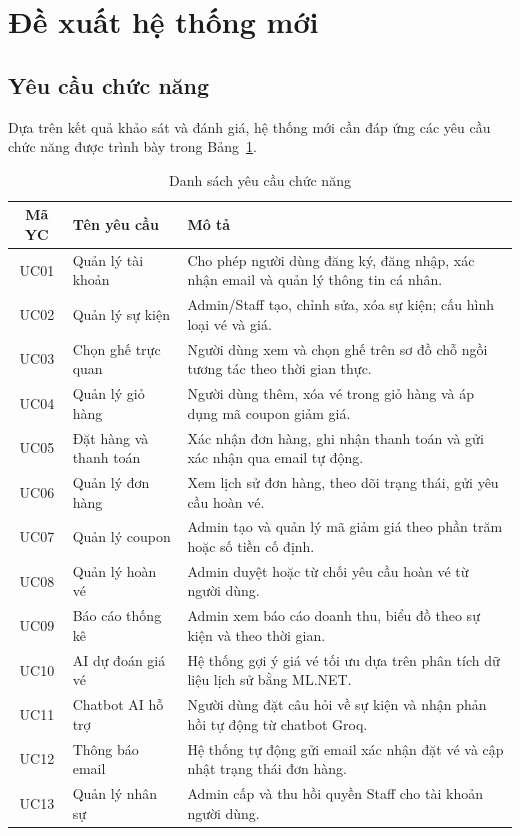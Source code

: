 \documentclass[../main.tex]{subfiles}
\begin{document}
\section{Đề xuất hệ thống mới}

\subsection{Yêu cầu chức năng}

Dựa trên kết quả khảo sát và đánh giá, hệ thống mới cần đáp ứng các yêu cầu chức năng được trình bày trong Bảng~\ref{tab:yc-chuc-nang}.

\begin{table}[H]
\centering
\caption{Danh sách yêu cầu chức năng}
\label{tab:yc-chuc-nang}
\begin{tabular}{|c|p{4cm}|p{7cm}|}
\hline
\textbf{Mã YC} & \textbf{Tên yêu cầu} & \textbf{Mô tả} \\
\hline
UC01 & Quản lý tài khoản & Cho phép người dùng đăng ký, đăng nhập, xác nhận email và quản lý thông tin cá nhân. \\
\hline
UC02 & Quản lý sự kiện & Admin/Staff tạo, chỉnh sửa, xóa sự kiện; cấu hình loại vé và giá. \\
\hline
UC03 & Chọn ghế trực quan & Người dùng xem và chọn ghế trên sơ đồ chỗ ngồi tương tác theo thời gian thực. \\
\hline
UC04 & Quản lý giỏ hàng & Người dùng thêm, xóa vé trong giỏ hàng và áp dụng mã coupon giảm giá. \\
\hline
UC05 & Đặt hàng và thanh toán & Xác nhận đơn hàng, ghi nhận thanh toán và gửi xác nhận qua email tự động. \\
\hline
UC06 & Quản lý đơn hàng & Xem lịch sử đơn hàng, theo dõi trạng thái, gửi yêu cầu hoàn vé. \\
\hline
UC07 & Quản lý coupon & Admin tạo và quản lý mã giảm giá theo phần trăm hoặc số tiền cố định. \\
\hline
UC08 & Quản lý hoàn vé & Admin duyệt hoặc từ chối yêu cầu hoàn vé từ người dùng. \\
\hline
UC09 & Báo cáo thống kê & Admin xem báo cáo doanh thu, biểu đồ theo sự kiện và theo thời gian. \\
\hline
UC10 & AI dự đoán giá vé & Hệ thống gợi ý giá vé tối ưu dựa trên phân tích dữ liệu lịch sử bằng ML.NET. \\
\hline
UC11 & Chatbot AI hỗ trợ & Người dùng đặt câu hỏi về sự kiện và nhận phản hồi tự động từ chatbot Groq. \\
\hline
UC12 & Thông báo email & Hệ thống tự động gửi email xác nhận đặt vé và cập nhật trạng thái đơn hàng. \\
\hline
UC13 & Quản lý nhân sự & Admin cấp và thu hồi quyền Staff cho tài khoản người dùng. \\
\hline
\end{tabular}
\end{table}
\end{document}
